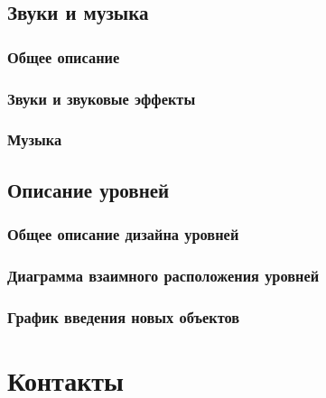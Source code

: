 \documentclass{article}
\begin{document}
\subsection{Звуки и музыка}
\subsubsection{Общее описание}
\subsubsection{Звуки и звуковые эффекты}
\subsubsection{Музыка}
\subsection{Описание уровней}
\subsubsection{Общее описание дизайна уровней}
\subsubsection{Диаграмма взаимного расположения уровней}
\subsubsection{ График введения новых объектов}
\section{Контакты}


\end{document}
